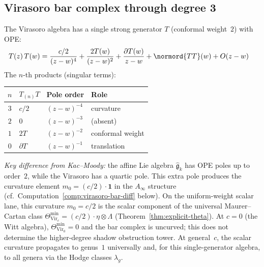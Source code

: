 \subsection{Virasoro bar complex through degree 3}

\begin{computation}
The Virasoro algebra has a single strong generator $T$ (conformal weight~$2$) with OPE:
\begin{align*}
T(z)\,T(w) &= \frac{c/2}{(z-w)^4} + \frac{2T(w)}{(z-w)^2} + \frac{\partial T(w)}{z-w} + \normord{TT}(w) + O(z-w)
\end{align*}
The $n$-th products (singular terms):
\begin{center}
\begin{tabular}{clll}
$n$ & $T_{(n)}T$ & Pole order & Role \\
\hline
$3$ & $c/2$ & $(z\!-\!w)^{-4}$ & curvature \\
$2$ & $0$ & $(z\!-\!w)^{-3}$ & (absent) \\
$1$ & $2T$ & $(z\!-\!w)^{-2}$ & conformal weight \\
$0$ & $\partial T$ & $(z\!-\!w)^{-1}$ & translation
\end{tabular}
\end{center}

\emph{Key difference from Kac--Moody:} the affine Lie algebra $\widehat{\mathfrak{g}}_k$ has OPE poles up to order~$2$, while the Virasoro has a quartic pole. This extra pole produces the curvature element $m_0 = (c/2)\cdot\mathbf{1}$ in the $A_\infty$ structure (cf.\ Computation~\ref{comp:virasoro-bar-diff} below).
On the uniform-weight scalar lane, this curvature $m_0 = c/2$ is
the scalar component of the
universal Maurer--Cartan class
$\Theta_{\mathrm{Vir}_c}^{\min} = (c/2)\cdot\eta\otimes\Lambda$
(Theorem~\ref{thm:explicit-theta}). At $c = 0$ (the Witt algebra),
$\Theta_{\mathrm{Vir}_0}^{\min} = 0$ and the bar complex is
uncurved; this does not determine the higher-degree shadow obstruction tower. At
general~$c$, the scalar curvature propagates to genus~$1$ universally
and, for this single-generator algebra, to all genera via the Hodge classes
$\lambda_g$.
\end{computation}

